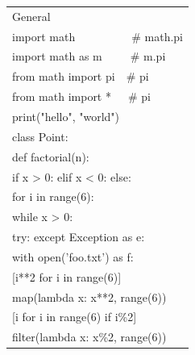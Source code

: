 \documentclass{article}
\begin{document}
\ttfamily

\begin{minipage}{0.9\textwidth}
\small
\begin{multicols}{3}

\begin{tabular}{l}
\color{pythonblue} {\sffamily General}                                \\
import math\ \ \ \ \ \ \ \ \ \ \# math.pi                             \\
import math as m\ \ \ \ \ \# m.pi                                     \\
from math import pi\ \ \# pi                                          \\
from math import *\ \ \ \# pi                                         \\
print("hello", "world")                                               \\
class Point:                                                          \\
def factorial(n):                                                     \\
if x > 0: elif x < 0: else:                                           \\
for i in range(6):                                                    \\
while x > 0:                                                          \\
try: except Exception as e:                                           \\
with open('foo.txt') as f:                                            \\
{[}i**2 for i in range(6){]}                                          \\
map(lambda x: x**2, range(6))                                         \\
{[}i for i in range(6) if i\%2{]}                                     \\
filter(lambda x: x\%2, range(6))                                      \\
\end{tabular}


\end{multicols}
\end{minipage}
\end{document}
